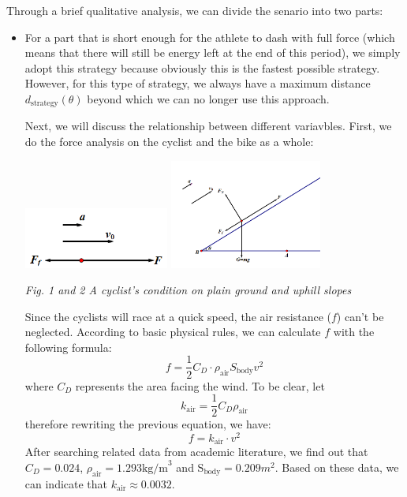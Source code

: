 \documentclass{article}
\begin{document}
			Through a brief qualitative analysis, we can divide the senario into two parts:
			\begin{itemize}
				\item For a part that is short enough for the athlete to dash with full force (which means that there will still be energy left at the end of this period), we simply adopt this strategy because obviously this is the fastest possible strategy. However, for this type of strategy, we always have a maximum distance \(d_{\mathrm{strategy}}\left(\theta\right)\) beyond which we can no longer use this approach.


					Next, we will discuss the relationship between different variavbles. First, we do the force analysis on the cyclist and the bike as a whole:

					\begin{center}
						\includegraphics[height=2cm]{4.png}
						\includegraphics[width=5cm]{5.png}

						\small \textit{Fig. 1 and 2 A cyclist's condition on plain ground and uphill slopes}
					\end{center}

					Since the cyclists will race at a quick speed, the air resistance ($f$) can't be neglected. According to basic physical rules, we can calculate \(f\) with the following formula:
					$$f=\dfrac{1}{2}  C _ D  \cdot \rho_\mathrm{air} S_\mathrm{body} v^2$$
					where \(C_D\) represents the area facing the wind. To be clear, let
					$$ k _\mathrm{air}=\dfrac{1}{2}  C _ D  \rho_\mathrm{air}$$
					therefore rewriting the previous equation, we have:
					$$f= k _\mathrm{air}\cdot v^2$$
					After searching related data from academic literature, we find out that $ C _ D =0.024$, $\rho_\mathrm{air}=1.293 \mathrm{kg/m}^3$ and $\mathrm{S}_\mathrm{body}=0.209 m^2$. Based on these data, we can indicate that $ k _\mathrm{air}\approx0.0032$.


\end{itemize}
\end{document}
